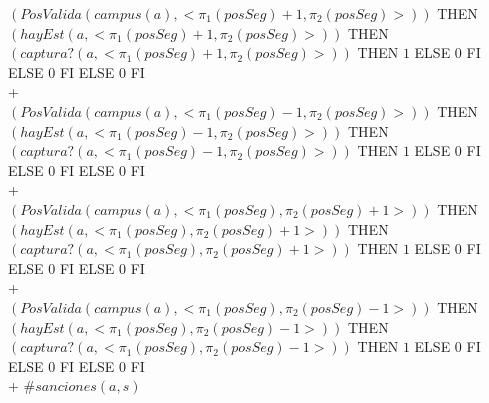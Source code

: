 \documentclass[10pt, a4paper]{article}
\begin{document}
\begin{tad}{}
{    {\IF $(PosValida(campus(a),<\pi_1(posSeg)+1,\pi_2(posSeg)>))$ THEN
    {\IF $(hayEst(a,<\pi_1(posSeg)+1,\pi_2(posSeg)>))$ THEN
    {\IF $(captura?(a,<\pi_1(posSeg)+1,\pi_2(posSeg)>))$ THEN $1$ ELSE $0$ FI}
    ELSE $0$ FI}
    ELSE $0$ FI}\\
    +\\
    {\IF $(PosValida(campus(a),<\pi_1(posSeg)-1,\pi_2(posSeg)>))$ THEN
    {\IF $(hayEst(a,<\pi_1(posSeg)-1,\pi_2(posSeg)>))$ THEN
    {\IF $(captura?(a,<\pi_1(posSeg)-1,\pi_2(posSeg)>))$ THEN $1$ ELSE $0$ FI}
    ELSE $0$ FI}
    ELSE $0$ FI}\\
    +\\
    {\IF $(PosValida(campus(a),<\pi_1(posSeg),\pi_2(posSeg)+1>))$ THEN
    {\IF $(hayEst(a,<\pi_1(posSeg),\pi_2(posSeg)+1>))$ THEN
    {\IF $(captura?(a,<\pi_1(posSeg),\pi_2(posSeg)+1>))$ THEN $1$ ELSE $0$ FI}
    ELSE $0$ FI}
    ELSE $0$ FI}\\
    +\\
    {\IF $(PosValida(campus(a),<\pi_1(posSeg),\pi_2(posSeg)-1>))$ THEN
    {\IF $(hayEst(a,<\pi_1(posSeg),\pi_2(posSeg)-1>))$ THEN
    {\IF $(captura?(a,<\pi_1(posSeg),\pi_2(posSeg)-1>))$ THEN $1$ ELSE $0$ FI}
    ELSE $0$ FI}
    ELSE $0$ FI}\\
    + $\#sanciones(a,s)$
}


							   

\end{tad}
\end{document}

